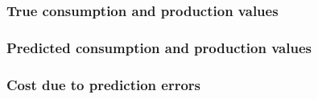\subsubsection{True consumption and production values}



\subsubsection{Predicted consumption and production values}



\subsubsection{Cost due to prediction errors}




